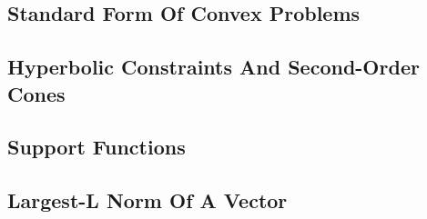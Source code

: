 \subsection{Standard Form Of Convex Problems}
\subsection{Hyperbolic Constraints And Second-Order Cones}
\subsection{Support Functions}
\subsection{Largest-L Norm Of A Vector}
